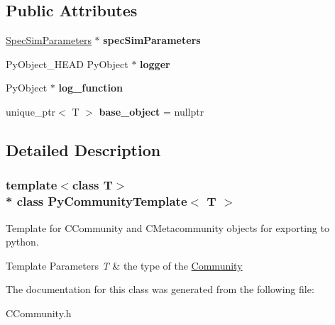 \subsection*{Public Attributes}
\begin{DoxyCompactItemize}
\item 
\hyperlink{struct_spec_sim_parameters}{Spec\+Sim\+Parameters} $\ast$ {\bfseries spec\+Sim\+Parameters}\hypertarget{class_py_community_template_a37402f384e75c02c50360cecfe6b2267}{}\label{class_py_community_template_a37402f384e75c02c50360cecfe6b2267}

\item 
Py\+Object\+\_\+\+H\+E\+AD Py\+Object $\ast$ {\bfseries logger}\hypertarget{class_py_template_a5b741a472639d65f9bcad29afa16ec99}{}\label{class_py_template_a5b741a472639d65f9bcad29afa16ec99}

\item 
Py\+Object $\ast$ {\bfseries log\+\_\+function}\hypertarget{class_py_template_a98bb8152faa73d028342d5cf260f0372}{}\label{class_py_template_a98bb8152faa73d028342d5cf260f0372}

\item 
unique\+\_\+ptr$<$ T $>$ {\bfseries base\+\_\+object} = nullptr\hypertarget{class_py_template_a14da655e6d3c0b398d8478058316d326}{}\label{class_py_template_a14da655e6d3c0b398d8478058316d326}

\end{DoxyCompactItemize}


\subsection{Detailed Description}
\subsubsection*{template$<$class T$>$\\*
class Py\+Community\+Template$<$ T $>$}

Template for C\+Community and C\+Metacommunity objects for exporting to python. 


\begin{DoxyTemplParams}{Template Parameters}
{\em T} & the type of the \hyperlink{class_community}{Community} \\
\hline
\end{DoxyTemplParams}


The documentation for this class was generated from the following file\+:\begin{DoxyCompactItemize}
\item 
C\+Community.\+h\end{DoxyCompactItemize}
